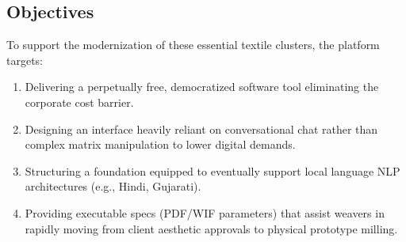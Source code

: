\subsection{Objectives}
To support the modernization of these essential textile clusters, the platform targets:
\begin{enumerate}
    \item Delivering a perpetually free, democratized software tool eliminating the corporate cost barrier.
    \item Designing an interface heavily reliant on conversational chat rather than complex matrix manipulation to lower digital demands.
    \item Structuring a foundation equipped to eventually support local language NLP architectures (e.g., Hindi, Gujarati).
    \item Providing executable specs (PDF/WIF parameters) that assist weavers in rapidly moving from client aesthetic approvals to physical prototype milling.
\end{enumerate}
